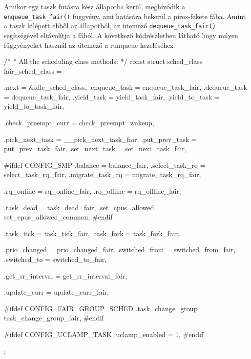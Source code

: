 Amikor egy taszk futásra kész állapotba kerül, meghívódik a \texttt{enqueue\_task\_fair()}  függvény, ami hatására bekerül a piros-fekete fába. Amint a taszk kilépett ebből az állapotból, az ütemező \texttt{dequeue\_task\_fair()} segítségével eltávolítja a fából.
A következő kódrészletben látható hogy milyen függvényeket használ az ütemező a runqueue kezeléséhez.

\begin{cpp}
/*
 * All the scheduling class methods:
 */
const struct sched_class fair_sched_class = {
	.next			= &idle_sched_class,
	.enqueue_task		= enqueue_task_fair,
	.dequeue_task		= dequeue_task_fair,
	.yield_task		= yield_task_fair,
	.yield_to_task		= yield_to_task_fair,

	.check_preempt_curr	= check_preempt_wakeup,

	.pick_next_task		= __pick_next_task_fair,
	.put_prev_task		= put_prev_task_fair,
	.set_next_task          = set_next_task_fair,

#ifdef CONFIG_SMP
	.balance		= balance_fair,
	.select_task_rq		= select_task_rq_fair,
	.migrate_task_rq	= migrate_task_rq_fair,

	.rq_online		= rq_online_fair,
	.rq_offline		= rq_offline_fair,

	.task_dead		= task_dead_fair,
	.set_cpus_allowed	= set_cpus_allowed_common,
#endif

	.task_tick		= task_tick_fair,
	.task_fork		= task_fork_fair,

	.prio_changed		= prio_changed_fair,
	.switched_from		= switched_from_fair,
	.switched_to		= switched_to_fair,

	.get_rr_interval	= get_rr_interval_fair,

	.update_curr		= update_curr_fair,

#ifdef CONFIG_FAIR_GROUP_SCHED
	.task_change_group	= task_change_group_fair,
#endif

#ifdef CONFIG_UCLAMP_TASK
	.uclamp_enabled		= 1,
#endif
};
\end{cpp}

